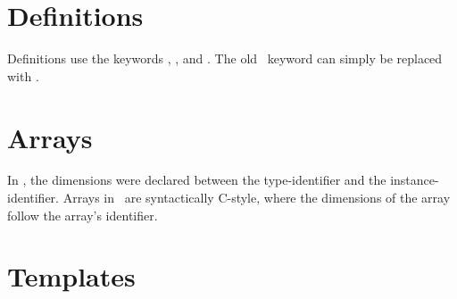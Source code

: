 \documentclass[12pt]{article}
\begin{document}
\section{Definitions}
\label{sec:definitions}

Definitions use the keywords , , and .  
The old \CAST\ keyword  can simply be replaced with .  

\section{Arrays}
\label{sec:arrays}

In \CAST, the dimensions were declared between the type-identifier
and the instance-identifier.  
Arrays in \hac\ are syntactically C-style, where the dimensions of the 
array follow the array's identifier.  

\section{Templates}
\label{sec:templates}

% 

\end{document}

